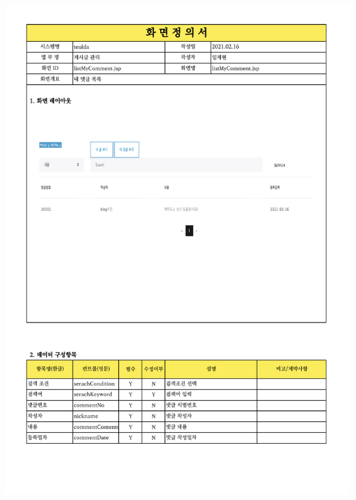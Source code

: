 {{{{{{{{{{{{{{{{{{{{{{{{{{{{{{{{{{{{{{{{{{{{{{{{{{{{{{{{{\includegraphics[width=20cm]{./Figure/Design/Display/post/post_05.pdf} \\
}}}}}}}}}}}}}}}}}}}}}}}}}}}}}}}}}}}}}}}}}}}}}}}}}}}}}}}}}
